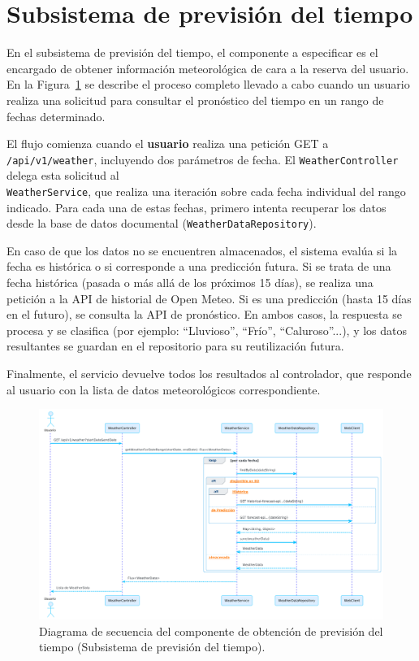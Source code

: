 \section{Subsistema de previsión del tiempo}

En el subsistema de previsión del tiempo, el componente a especificar es el encargado de obtener información meteorológica de cara a la reserva del usuario. En la Figura~\ref{fig:secuencia_tiempo} se describe el proceso completo llevado a cabo cuando un usuario realiza una solicitud para consultar el pronóstico del tiempo en un rango de fechas determinado.

El flujo comienza cuando el \textbf{usuario} realiza una petición GET a \texttt{/api/v1/weather}, incluyendo dos parámetros de fecha. El \texttt{WeatherController} delega esta solicitud al \\ \texttt{WeatherService}, que realiza una iteración sobre cada fecha individual del rango indicado. Para cada una de estas fechas, primero intenta recuperar los datos desde la base de datos documental (\texttt{WeatherDataRepository}).

En caso de que los datos no se encuentren almacenados, el sistema evalúa si la fecha es histórica o si corresponde a una predicción futura. Si se trata de una fecha histórica (pasada o más allá de los próximos 15 días), se realiza una petición a la API de historial de Open Meteo. Si es una predicción (hasta 15 días en el futuro), se consulta la API de pronóstico. En ambos casos, la respuesta se procesa y se clasifica (por ejemplo: ``Lluvioso'', ``Frío'', ``Caluroso''...), y los datos resultantes se guardan en el repositorio para su reutilización futura.

Finalmente, el servicio devuelve todos los resultados al controlador, que responde al usuario con la lista de datos meteorológicos correspondiente.

\begin{figure}[h!tb]
    \centering
    \includegraphics[width=1\textwidth]{figs/secuencia_tiempo.png}
    \caption{Diagrama de secuencia del componente de obtención de previsión del tiempo (Subsistema de previsión del tiempo).\label{fig:secuencia_tiempo}}
\end{figure}


